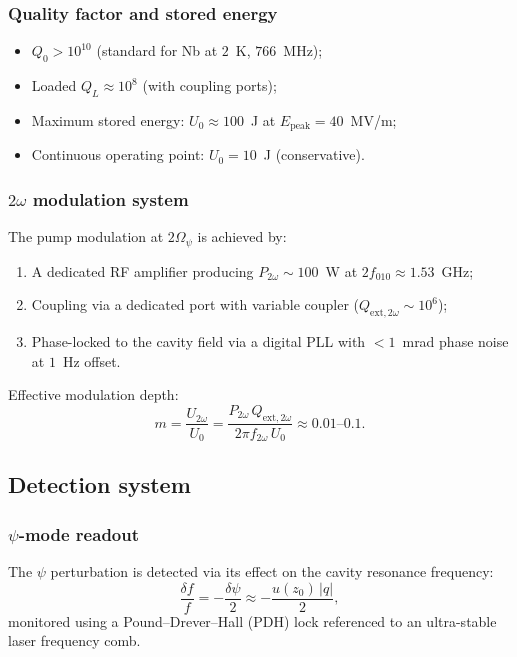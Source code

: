 \documentclass[12pt,aps,prd,twocolumn,superscriptaddress,nofootinbib]{revtex4-2}
\newcommand{\Opsi}{\Omega_\psi}
\begin{document}
\subsubsection{Quality factor and stored energy}

\begin{itemize}[noitemsep]
  \item $Q_0 > 10^{10}$ (standard for Nb at $2$~K, $766$~MHz);
  \item Loaded $Q_L \approx 10^8$ (with coupling ports);
  \item Maximum stored energy: $U_0 \approx 100$~J at
    $E_{\mathrm{peak}} = 40$~MV/m;
  \item Continuous operating point: $U_0 = 10$~J (conservative).
\end{itemize}

\subsubsection{$2\omega$ modulation system}

The pump modulation at $2\Opsi$ is achieved by:
\begin{enumerate}[noitemsep]
  \item A dedicated RF amplifier producing
    $P_{2\omega} \sim 100$~W at $2f_{010} \approx 1.53$~GHz;
  \item Coupling via a dedicated port with variable coupler
    ($Q_{\mathrm{ext},2\omega} \sim 10^6$);
  \item Phase-locked to the cavity field via a digital PLL with
    $< 1$~mrad phase noise at $1$~Hz offset.
\end{enumerate}

Effective modulation depth:
\begin{equation}
  m = \frac{U_{2\omega}}{U_0}
  = \frac{P_{2\omega}\,Q_{\mathrm{ext},2\omega}}{2\pi f_{2\omega}\,U_0}
  \approx 0.01\text{--}0.1.
  \label{eq:mod_depth}
\end{equation}

\subsection{Detection system}

\subsubsection{$\psi$-mode readout}

The $\psi$ perturbation is detected via its effect on the cavity
resonance frequency:
\begin{equation}
  \frac{\delta f}{f} = -\frac{\delta\psi}{2}
  \approx -\frac{u(z_0)\,|q|}{2},
  \label{eq:freq_readout}
\end{equation}
monitored using a Pound--Drever--Hall (PDH) lock referenced to an
ultra-stable laser frequency comb.
\end{document}
